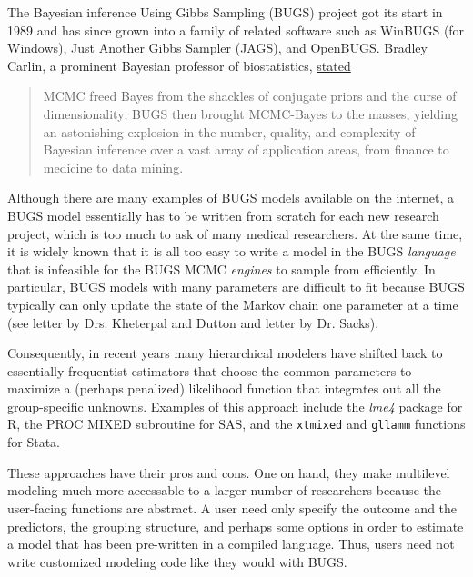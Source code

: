 \documentclass[11pt,notitlepage]{article}
\begin{document}
The Bayesian inference Using Gibbs Sampling (BUGS) project got its start in 1989 and has 
since grown into a family of related software such as WinBUGS (for Windows), Just Another
Gibbs Sampler (JAGS), and OpenBUGS. Bradley Carlin, a prominent Bayesian professor of biostatistics, 
\href{http://www.mrc-bsu.cam.ac.uk/software/bugs/the-bugs-project-the-bugs-book/the-bugs-book-reviews/}{stated}
\begin{quote}
MCMC freed Bayes from the shackles of conjugate priors and the curse of dimensionality; 
BUGS then brought MCMC-Bayes to the masses, yielding an astonishing explosion in the number, 
quality, and complexity of Bayesian inference over a vast array of application areas, from 
finance to medicine to data mining.
\end{quote}
Although there are many examples of BUGS models available on the internet, a BUGS model
essentially has to be written from scratch for each new research project, which is too much
to ask of many medical researchers. At the same time, it is widely known that it is all too easy to 
write a model in the BUGS \textit{language} that is infeasible for the BUGS MCMC \textit{engines} 
to sample from efficiently. In particular, BUGS models with many parameters are difficult to fit 
because BUGS typically can only update the state of the Markov chain one parameter at a time
(see letter by Drs. Kheterpal and Dutton and letter by Dr. Sacks).

Consequently, in recent years many hierarchical modelers have shifted back to essentially
frequentist estimators that choose the common parameters to maximize a (perhaps penalized) 
likelihood function that integrates out all the group-specific unknowns. Examples of this
approach include the \textit{lme4} package for R, the PROC MIXED subroutine for SAS, and
the \texttt{xtmixed} and \texttt{gllamm} functions for Stata. 

These approaches have their pros and cons. One on hand, they make multilevel modeling much more accessable to a larger number
of researchers because the user-facing functions are abstract. A user need only specify the
outcome and the predictors, the grouping structure, and perhaps some options in order to estimate
a model that has been pre-written in a compiled language. Thus, users need not write customized 
modeling code like they would with BUGS.
\end{document}
